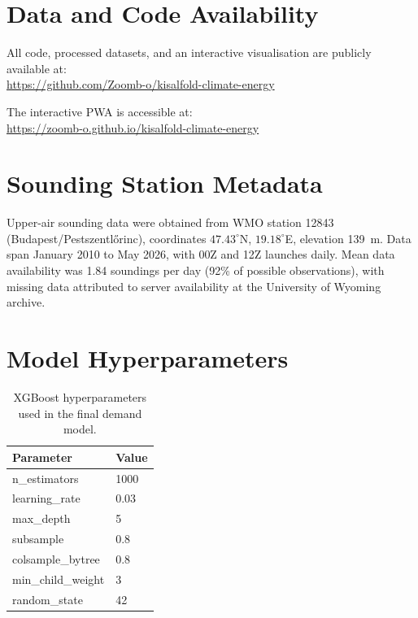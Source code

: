 \documentclass[11pt,a4paper]{article}
\begin{document}
\section*{Data and Code Availability}

All code, processed datasets, and an interactive visualisation are
publicly available at:\\
\url{https://github.com/Zoomb-o/kisalfold-climate-energy}

The interactive PWA is accessible at:\\
\url{https://zoomb-o.github.io/kisalfold-climate-energy}




\appendix

\section{Sounding Station Metadata}
\label{app:soundings}

Upper-air sounding data were obtained from WMO station 12843
(Budapest/Pestszentl\H{o}rinc), coordinates $47.43^\circ$N,
$19.18^\circ$E, elevation 139~m. Data span January 2010 to May 2026,
with 00Z and 12Z launches daily. Mean data availability was 1.84
soundings per day (92\% of possible observations), with missing data
attributed to server availability at the University of Wyoming archive.

\section{Model Hyperparameters}
\label{app:hyperparams}

\begin{table}[htbp]
  \centering
  \caption{XGBoost hyperparameters used in the final demand model.}
  \begin{tabular}{ll}
    \toprule
    Parameter & Value \\
    \midrule
    n\_estimators & 1000 \\
    learning\_rate & 0.03 \\
    max\_depth & 5 \\
    subsample & 0.8 \\
    colsample\_bytree & 0.8 \\
    min\_child\_weight & 3 \\
    random\_state & 42 \\
    \bottomrule
  \end{tabular}
  \label{tab:hyperparams}
\end{table}
\end{document}
